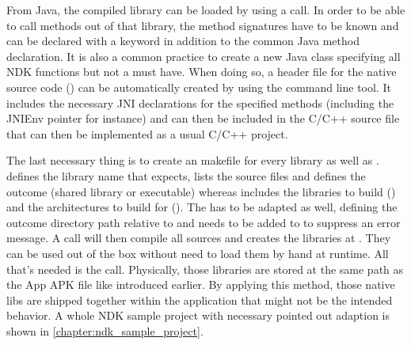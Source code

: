 From Java, the compiled library can be loaded by using a
 call. In order to be able to call methods out
of that library, the method signatures have to be known and can be declared with
a  keyword in addition to the common Java method declaration. It is also a
common practice to create a new Java class specifying all NDK functions but not a must have. When doing so, a header file for the native source code () can be automatically
created by using the  command line tool. It includes the necessary JNI
declarations for the specified methods (including the JNIEnv pointer for instance)
and can then be included in the C/C++ source file that can then be implemented as a
usual C/C++ project.

The last necessary thing is to create an  makefile for every library as well as .  defines the library name that  expects, lists the source files and defines the outcome (shared library or executable) whereas  includes
the libraries to build () and the architectures to build for
(). The  has to be adapted as well, defining the
outcome directory path relative to  and  needs to be added to  to suppress an error message.
A  call will then compile all sources and creates the libraries
at . They can be used out of the box without need to load them by hand
at runtime. All that's needed is the  call. Physically, those libraries are stored at the same path as the App APK file like introduced earlier. By applying this method, those native libs are shipped together within the application that might not be the intended behavior. A whole NDK sample project with necessary
pointed out adaption is shown in \autoref{chapter:ndk_sample_project}.

